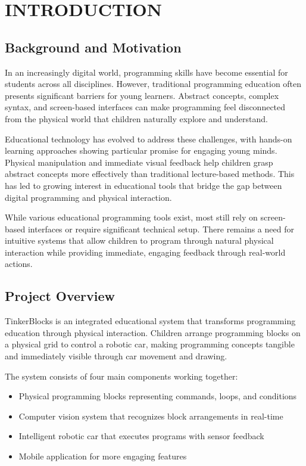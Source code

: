 \chapter{INTRODUCTION}

\section{Background and Motivation}

In an increasingly digital world, programming skills have become essential for students across all disciplines. However, traditional programming education often presents significant barriers for young learners. Abstract concepts, complex syntax, and screen-based interfaces can make programming feel disconnected from the physical world that children naturally explore and understand.

Educational technology has evolved to address these challenges, with hands-on learning approaches showing particular promise for engaging young minds. Physical manipulation and immediate visual feedback help children grasp abstract concepts more effectively than traditional lecture-based methods. This has led to growing interest in educational tools that bridge the gap between digital programming and physical interaction.

While various educational programming tools exist, most still rely on screen-based interfaces or require significant technical setup. There remains a need for intuitive systems that allow children to program through natural physical interaction while providing immediate, engaging feedback through real-world actions.

\section{Project Overview}

TinkerBlocks is an integrated educational system that transforms programming education through physical interaction. Children arrange programming blocks on a physical grid to control a robotic car, making programming concepts tangible and immediately visible through car movement and drawing.

The system consists of four main components working together:
\begin{itemize}
    \item Physical programming blocks representing commands, loops, and conditions
    \item Computer vision system that recognizes block arrangements in real-time
    \item Intelligent robotic car that executes programs with sensor feedback
    \item Mobile application for more engaging features
\end{itemize}

